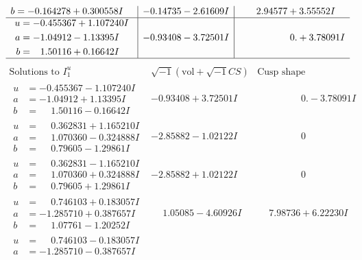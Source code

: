 \documentclass[1p]{elsarticle_modified}
\theoremstyle{definition}
\newcommand{\I}{\sqrt{-1}}
\begin{document}
$$\begin{array}{c|c|c}
\begin{aligned}
b &= -0.164278 + 0.300558 I\end{aligned}
 & -0.14735 - 2.61609 I & \phantom{-}2.94577 + 3.55552 I \\ \hline\begin{aligned}
u &= -0.455367 + 1.107240 I \\
a &= -1.04912 - 1.13395 I \\
b &= \phantom{-}1.50116 + 0.16642 I\end{aligned}
 & -0.93408 - 3.72501 I & \phantom{-0.000000 -}0. + 3.78091 I\\
 \hline 
 \end{array}$$\newpage$$\begin{array}{c|c|c}  
\text{Solutions to }I^u_{1}& \I (\text{vol} + \sqrt{-1}CS) & \text{Cusp shape}\\
 \hline 
\begin{aligned}
u &= -0.455367 - 1.107240 I \\
a &= -1.04912 + 1.13395 I \\
b &= \phantom{-}1.50116 - 0.16642 I\end{aligned}
 & -0.93408 + 3.72501 I & \phantom{-0.000000 } 0. - 3.78091 I \\ \hline\begin{aligned}
u &= \phantom{-}0.362831 + 1.165210 I \\
a &= \phantom{-}1.070360 - 0.324888 I \\
b &= \phantom{-}0.79605 - 1.29861 I\end{aligned}
 & -2.85882 - 1.02122 I & \phantom{-0.000000 } 0 \\ \hline\begin{aligned}
u &= \phantom{-}0.362831 - 1.165210 I \\
a &= \phantom{-}1.070360 + 0.324888 I \\
b &= \phantom{-}0.79605 + 1.29861 I\end{aligned}
 & -2.85882 + 1.02122 I & \phantom{-0.000000 } 0 \\ \hline\begin{aligned}
u &= \phantom{-}0.746103 + 0.183057 I \\
a &= -1.285710 + 0.387657 I \\
b &= \phantom{-}1.07761 - 1.20252 I\end{aligned}
 & \phantom{-}1.05085 - 4.60926 I & \phantom{-}7.98736 + 6.22230 I \\ \hline\begin{aligned}
u &= \phantom{-}0.746103 - 0.183057 I \\
a &= -1.285710 - 0.387657 I \\

\end{aligned}
\end{array}$$
\end{document}
